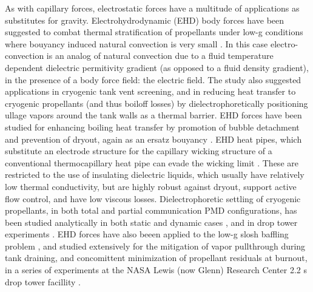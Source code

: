 \documentclass[12pt,a4paper,oneside]{book}
\begin{document}
As with capillary forces, electrostatic forces have a multitude of applications as substitutes for gravity. Electrohydrodynamic (EHD) body forces have been suggested to combat thermal stratification of propellants under low-g conditions where bouyancy induced natural convection is very small \cite{blackmon_collection_1965}. In this case electro-convection is an analog of natural convection due to a fluid temperature dependent dielectric permitivity gradient (as opposed to a fluid density gradient), in the presence of a body force field: the electric field. The study also suggested applications in cryogenic tank vent screening, and in reducing heat transfer to cryogenic propellants (and thus boiloff losses) by dielectrophoretically positioning ullage vapors around the tank walls as a thermal barrier. EHD forces have been studied for enhancing boiling heat transfer by promotion of bubble detachment and prevention of dryout, again as an ersatz bouyancy \cite{snyder_dielectrophoresis_2001} \cite{di_marco_influence_2003} \cite{marco_use_2012}. EHD heat pipes, which substitute an electrode structure for the capillary wicking structure of a conventional thermocapillary heat pipe can evade the wicking limit \cite{jones_electrohydrodynamic_1973}. These are restricted to the use of insulating dielectric liquids, which usually have relatively low thermal conductivity, but are highly robust against dryout, support active flow control, and have low viscous losses. Dielectrophoretic settling of cryogenic propellants, in both total and partial communication PMD configurations, has been studied analytically in both static \cite{hurwitz_electrohydrodynamic_1966} and dynamic cases \cite{koval_dynamics_1967}, and in drop tower experiments \cite{fax_dielectrophoretic_1969}. EHD forces have also beeen applied to the low-g slosh baffling problem \cite{boretz_orbital_1970} \cite{petrash_use_1968} \cite{hurwitz_dielectrophoretic_1968}, and studied extensively for the mitigation of vapor pullthrough during tank draining, and concomittent minimization of propellant residuals at burnout, in a series of experiments at the NASA Lewis (now Glenn) Research Center 2.2 s drop tower facillity \cite{berenyi_dielectrophoretic_1970}. 
\end{document}
